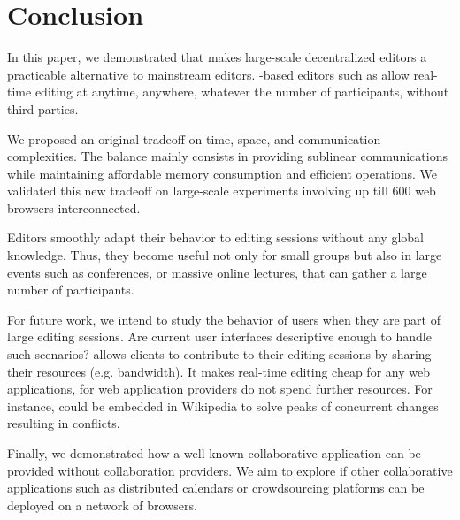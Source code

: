 
\section{Conclusion}
\label{sec:conclusion}

In this paper, we demonstrated that \LSEQ makes large-scale decentralized
editors a practicable alternative to mainstream editors. \LSEQ-based editors
such as \CRATE allow real-time editing at anytime, anywhere, whatever the number
of participants, without third parties.

We proposed an original tradeoff on time, space, and communication
complexities. The balance mainly consists in providing sublinear communications
while maintaining affordable memory consumption and efficient operations.  We
validated this new tradeoff on large-scale experiments involving up till 600 web
browsers interconnected.

Editors smoothly adapt their behavior to editing sessions without any global
knowledge. Thus, they become useful not only for small groups but also in large
events such as conferences, or massive online lectures, that can gather a large
number of participants.

For future work, we intend to study the behavior of users when they are part of
large editing sessions. Are current user interfaces descriptive enough to handle
such scenarios?  \CRATE allows clients to contribute to their editing sessions
by sharing their resources (e.g. bandwidth).  It makes real-time editing cheap
for any web applications, for web application providers do not spend further
resources. For instance, \CRATE could be embedded in Wikipedia to solve peaks of
concurrent changes resulting in
conflicts. %

Finally, we demonstrated how a well-known collaborative application can be
provided without collaboration providers. We aim to explore if other
collaborative applications such as distributed calendars or crowdsourcing
platforms can be deployed on a network of browsers.




